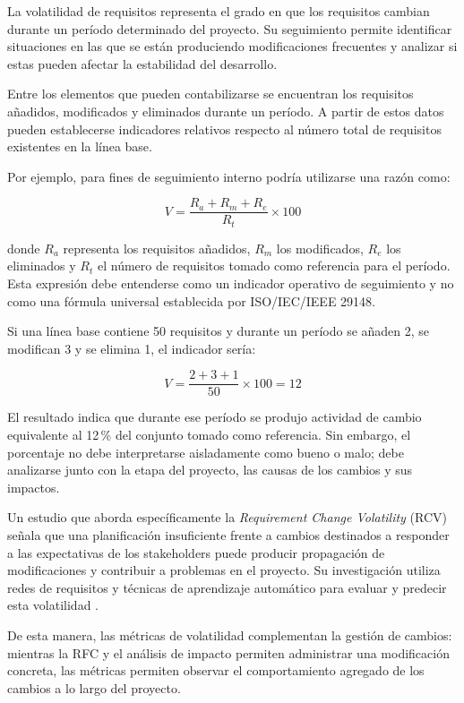 \documentclass[journal,onecolumn]{IEEEtran}
\begin{document}
	La volatilidad de requisitos representa el grado en que los requisitos cambian durante un período determinado del proyecto. Su seguimiento permite identificar situaciones en las que se están produciendo modificaciones frecuentes y analizar si estas pueden afectar la estabilidad del desarrollo.
	
	Entre los elementos que pueden contabilizarse se encuentran los requisitos añadidos, modificados y eliminados durante un período. A partir de estos datos pueden establecerse indicadores relativos respecto al número total de requisitos existentes en la línea base.
	
	Por ejemplo, para fines de seguimiento interno podría utilizarse una razón como:
	
	\begin{equation}
		V = \frac{R_a + R_m + R_e}{R_t} \times 100
	\end{equation}
	
	donde $R_a$ representa los requisitos añadidos, $R_m$ los modificados, $R_e$ los eliminados y $R_t$ el número de requisitos tomado como referencia para el período. Esta expresión debe entenderse como un indicador operativo de seguimiento y no como una fórmula universal establecida por ISO/IEC/IEEE 29148.
	
	Si una línea base contiene 50 requisitos y durante un período se añaden 2, se modifican 3 y se elimina 1, el indicador sería:
	
	\begin{equation}
		V = \frac{2 + 3 + 1}{50} \times 100 = 12
	\end{equation}
	
	El resultado indica que durante ese período se produjo actividad de cambio equivalente al 12\,\% del conjunto tomado como referencia. Sin embargo, el porcentaje no debe interpretarse aisladamente como bueno o malo; debe analizarse junto con la etapa del proyecto, las causas de los cambios y sus impactos.
	
	Un estudio que aborda específicamente la \textit{Requirement Change Volatility} (RCV) señala que una planificación insuficiente frente a cambios destinados a responder a las expectativas de los stakeholders puede producir propagación de modificaciones y contribuir a problemas en el proyecto. Su investigación utiliza redes de requisitos y técnicas de aprendizaje automático para evaluar y predecir esta volatilidad \cite{Hein2021}.
	
	De esta manera, las métricas de volatilidad complementan la gestión de cambios: mientras la RFC y el análisis de impacto permiten administrar una modificación concreta, las métricas permiten observar el comportamiento agregado de los cambios a lo largo del proyecto.
	
\end{document}
